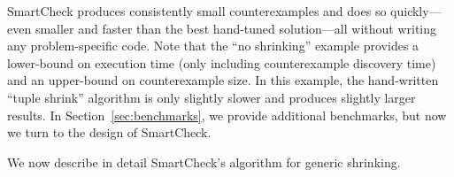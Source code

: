\documentclass{sigplanconf}
\newenvironment{code}{\begin{alltt}\footnotesize}{\end{alltt}}
\newcommand{\ttp}[1]{\texttt{#1}}
\begin{document}
SmartCheck produces consistently small counterexamples and does so
quickly---even smaller and faster than the best hand-tuned solution---all
without writing any problem-specific code.  Note that the ``no shrinking''
example provides a lower-bound on execution time (only including counterexample
discovery time) and an upper-bound on counterexample size.  In this example, the
hand-written ``tuple shrink'' algorithm is only slightly slower and produces
slightly larger results.  In Section~\ref{sec:benchmarks}, we provide additional
benchmarks, but now we turn to the design of SmartCheck.



We now describe in detail SmartCheck's algorithm for generic shrinking.
\end{document}
